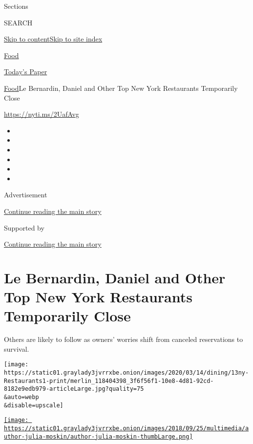 Sections

SEARCH

\protect\hyperlink{site-content}{Skip to
content}\protect\hyperlink{site-index}{Skip to site index}

\href{https://www.nytimes3xbfgragh.onion/section/food}{Food}

\href{https://myaccount.nytimes3xbfgragh.onion/auth/login?response_type=cookie\&client_id=vi}{}

\href{https://www.nytimes3xbfgragh.onion/section/todayspaper}{Today's
Paper}

\href{/section/food}{Food}\textbar{}Le Bernardin, Daniel and Other Top
New York Restaurants Temporarily Close

\url{https://nyti.ms/2UafAvg}

\begin{itemize}
\item
\item
\item
\item
\item
\item
\end{itemize}

Advertisement

\protect\hyperlink{after-top}{Continue reading the main story}

Supported by

\protect\hyperlink{after-sponsor}{Continue reading the main story}

\hypertarget{le-bernardin-daniel-and-other-top-new-york-restaurants-temporarily-close}{%
\section{Le Bernardin, Daniel and Other Top New York Restaurants
Temporarily
Close}\label{le-bernardin-daniel-and-other-top-new-york-restaurants-temporarily-close}}

Others are likely to follow as owners' worries shift from canceled
reservations to survival.

\texttt{[image: https://static01.graylady3jvrrxbe.onion/images/2020/03/14/dining/13ny-Restaurants1-print/merlin\_118404398\_3f6f56f1-10e8-4d81-92cd-8182e9edb979-articleLarge.jpg?quality=75\\\&auto=webp\\\&disable=upscale]}

\href{https://www.nytimes3xbfgragh.onion/by/julia-moskin}{\texttt{[image: https://static01.graylady3jvrrxbe.onion/images/2018/09/25/multimedia/author-julia-moskin/author-julia-moskin-thumbLarge.png]}}

